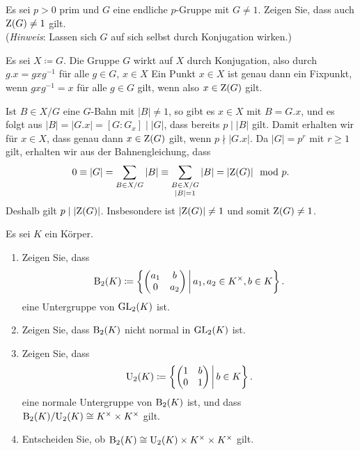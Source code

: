 \begin{question}[subtitle = Mehr Bahnenkombinatorik]
  Es sei $p > 0$ prim und $G$ eine endliche $p$-Gruppe mit $G \neq 1$.
  Zeigen Sie, dass auch $\operatorname{Z}(G) \neq 1$ gilt.
  \\
  (\emph{Hinweis}:
   Lassen sich $G$ auf sich selbst durch Konjugation wirken.)
\end{question}


\begin{solution}
  Es sei $X \coloneqq G$.
  Die Gruppe $G$ wirkt auf $X$ durch Konjugation, also durch $g.x = g x g^{-1}$ für alle $g \in G$, $x \in X$
  Ein Punkt $x \in X$ ist genau dann ein Fixpunkt, wenn $g x g^{-1} = x$ für alle $g \in G$ gilt, wenn also $x \in \operatorname{Z}(G)$ gilt.
  
  Ist $B \in X/G$ eine $G$-Bahn mit $|B| \neq 1$, so gibt es $x \in X$ mit $B = G.x$, und es folgt aus $|B| = |G.x| = [G : G_x] \mid |G|$, dass bereits $p \mid |B|$ gilt.
  Damit erhalten wir für $x \in X$, dass genau dann $x \in \operatorname{Z}(G)$ gilt, wenn $p \nmid |G.x|$.
  Da $|G| = p^r$ mit $r \geq 1$ gilt, erhalten wir aus der Bahnengleichung, dass
  \[
            0
    \equiv  |G|
    =       \sum_{B \in X/G} |B|
    \equiv  \sum_{\substack{B \in X/G \\ |B| = 1}} |B|
    =       |{\operatorname{Z}(G)}|
    \mod    p.
  \]
  Deshalb gilt $p \mid |{\operatorname{Z}(G)}|$.
  Insbesondere ist $|{\operatorname{Z}(G)}| \neq 1$ und somit $\operatorname{Z}(G) \neq 1$.
\end{solution}


\begin{question}[subtitle = Die oberen $2 \times 2$-Matrizen]
  Es sei $K$ ein Körper.
  \begin{enumerate}
    \item
      Zeigen Sie, dass
      \[
                  \operatorname{B}_2(K)
        \coloneqq \left\{
                    \begin{pmatrix}
                      a_1 & b   \\
                      0   & a_2
                    \end{pmatrix}
                  \,\middle|\,
                    a_1, a_2 \in K^\times,
                    b \in K
                  \right\}.
      \]
      eine Untergruppe von $\operatorname{GL}_2(K)$ ist.
    \item
      Zeigen Sie, dass $\operatorname{B}_2(K)$ nicht normal in $\operatorname{GL}_2(K)$ ist.
    \item
      Zeigen Sie, dass
      \[
                  \operatorname{U}_2(K)
        \coloneqq \left\{
                    \begin{pmatrix}
                      1 & b \\
                      0 & 1
                    \end{pmatrix}
                  \,\middle|\,
                    b \in K
                  \right\}.
      \]
      eine normale Untergruppe von $\operatorname{B}_2(K)$ ist, und dass $\operatorname{B}_2(K)/{\operatorname{U}_2(K)} \cong K^\times \times K^\times$ gilt.
    \item
      Entscheiden Sie, ob $\operatorname{B}_2(K) \cong \operatorname{U}_2(K) \times K^\times \times K^\times$ gilt.
  \end{enumerate}
\end{question}


